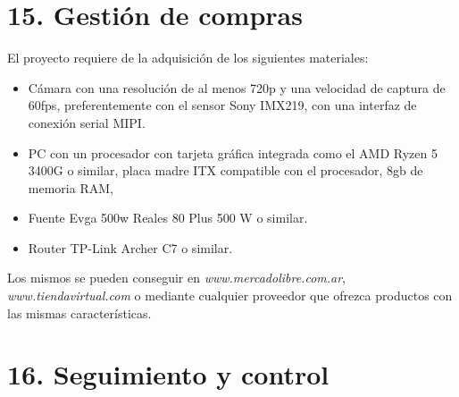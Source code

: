 \documentclass[11pt]{charter}
\begin{document}
\section{15. Gestión de compras}
\label{sec:compras}

El proyecto requiere de la adquisición de los siguientes materiales:
\begin{itemize}
\item Cámara con una resolución de al menos 720p y una velocidad de captura de
60fps, preferentemente con el sensor Sony IMX219, con una interfaz de conexión
serial MIPI.
\item PC con un procesador con tarjeta gráfica integrada como el AMD Ryzen 5 3400G
o similar, placa madre ITX compatible con el procesador, 8gb de memoria RAM,
\item Fuente Evga 500w Reales 80 Plus 500 W o similar.
\item Router TP-Link Archer C7 o similar.
\end{itemize}
Los mismos se pueden conseguir en \textit{www.mercadolibre.com.ar}, \textit{www.tiendavirtual.com} o mediante cualquier proveedor que ofrezca productos con las mismas características. 
\newpage
\section{16. Seguimiento y control}
\label{sec:seguimiento}


\end{document}
